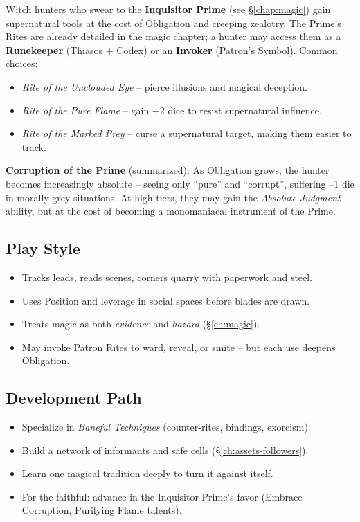 Witch hunters who swear to the \textbf{Inquisitor Prime} (see \S\ref{chap:magic}) gain supernatural tools at the cost of Obligation and creeping zealotry. The Prime’s Rites are already detailed in the magic chapter; a hunter may access them as a \textbf{Runekeeper} (Thiasos + Codex) or an \textbf{Invoker} (Patron’s Symbol). Common choices:

\begin{itemize}
  \item \emph{Rite of the Unclouded Eye} – pierce illusions and magical deception.
  \item \emph{Rite of the Pure Flame} – gain +2 dice to resist supernatural influence.
  \item \emph{Rite of the Marked Prey} – curse a supernatural target, making them easier to track.
\end{itemize}

\textbf{Corruption of the Prime} (summarized): As Obligation grows, the hunter becomes increasingly absolute – seeing only “pure” and “corrupt”, suffering –1 die in morally grey situations. At high tiers, they may gain the \emph{Absolute Judgment} ability, but at the cost of becoming a monomaniacal instrument of the Prime.

\subsection*{Play Style}
\begin{itemize}
  \item Tracks leads, reads scenes, corners quarry with paperwork and steel.
  \item Uses Position and leverage in social spaces before blades are drawn.
  \item Treats magic as both \emph{evidence} and \emph{hazard} (\S\ref{ch:magic}).
  \item May invoke Patron Rites to ward, reveal, or smite – but each use deepens Obligation.
\end{itemize}

\subsection*{Development Path}
\begin{itemize}
  \item Specialize in \emph{Baneful Techniques} (counter-rites, bindings, exorcism).
  \item Build a network of informants and safe cells (\S\ref{ch:assets-followers}).
  \item Learn one magical tradition deeply to turn it against itself.
  \item For the faithful: advance in the Inquisitor Prime’s favor (Embrace Corruption, Purifying Flame talents).
\end{itemize}

